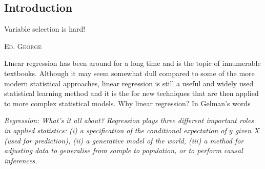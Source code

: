\documentclass[11 pt]{article}
\begin{document}
\begin{multicols}{2}


\section{Introduction}
\setlength{}
\epigraph{Variable selection is hard!}{\textsc{Ed. George}}

\lettrine[nindent=0em,lines=3]{L}inear regression has been around for a long time and is the topic of innumerable textbooks. Although it may seem somewhat dull compared to some of the more modern statistical approaches, linear regression is still a useful and widely used statistical learning method and it is the  for new techniques that are then applied to more complex statistical models. Why linear regression? In Gelman's words 

\begin{displayquote}
\textit{Regression: What’s it all about?
Regression plays three different important roles in applied statistics: \textit{(i)} a specification of the conditional expectation of $y$ given $X$ (used for prediction), \textit{(ii)} a generative model of the world, \textit{(iii)} a method for adjusting data to generalise from sample to population, or to perform causal inferences.} 
\end{displayquote}


\end{multicols}
\end{document}
